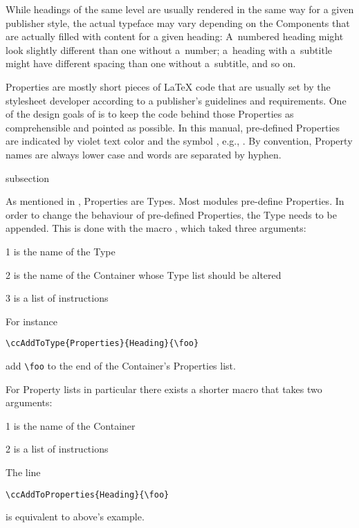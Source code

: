 While headings of the same level are usually rendered in the same way
for a given publisher style, the actual typeface may vary depending on
the Components that are actually filled with content for a given
heading: A~numbered heading might look slightly different than one
without a~number; a~heading with a~subtitle might have different
spacing than one without a~subtitle, and so on.

Properties are mostly short pieces of {\LaTeX} code that are usually
set by the stylesheet developer according to a publisher's guidelines
and requirements. One of the design goals of {\CoCoTeX} is to keep the
code behind those Properties as comprehensible and pointed as
possible. In this manual, pre-defined Properties are indicated by
violet text color and the symbol {\PropertySymbol}, e.g.,
. By convention, Property names are
always lower case and words are separated by hyphen.


\begin{Heading}{subsection}
\end{Heading}

As mentioned in , Properties are Types. Most
{\CoCoTeX} modules pre-define Properties. In order to change the
behaviour of pre-defined Properties, the Type needs to be
appended. This is done with the macro \DeclareMacro{\ccAddToType}, which taked three arguments:
\begin{ArgList}
\item[1] is the name of the Type
\item[2] is the name of the Container whose Type list should be altered
\item[3] is a list of instructions
\end{ArgList}
For instance
\begin{lstlisting}[style=tex]
\ccAddToType{Properties}{Heading}{\foo}
\end{lstlisting}
add \lstinline{\foo} to the end of the 
Container's Properties list.

For Property lists in particular there exists a shorter macro
\DeclareMacro{\ccAddToProperties} that takes two arguments:
\begin{ArgList}
\item[1] is the name of the Container
\item[2] is a list of instructions
\end{ArgList}
The line
\begin{lstlisting}[style=tex]
\ccAddToProperties{Heading}{\foo}
\end{lstlisting}
is equivalent to above's example.



